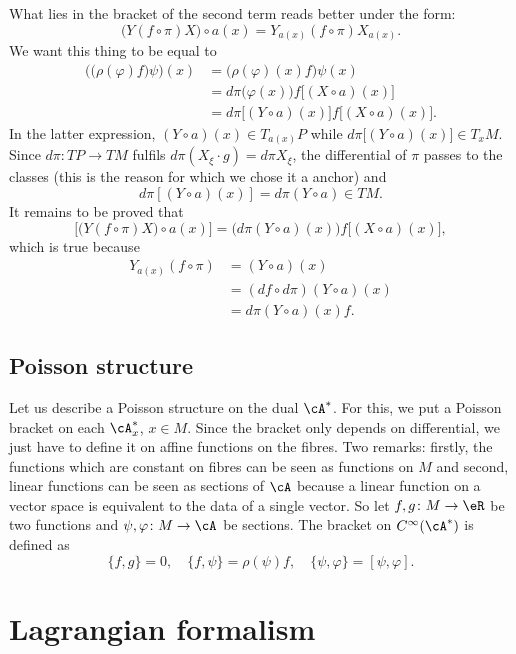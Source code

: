 What lies in the bracket of the second term reads better under the form:
\[
  \big( Y(f\circ\pi)X \big)\circ a(x)=Y_{a(x)}(f\circ\pi)X_{a(x)}.
\]
We want this thing to be equal to
\begin{align*}
\Big( \big( \rho(\varphi)f \big)\psi \Big)(x)&=\big( \rho(\varphi)(x)f \big)\psi(x)\\
		&=d\pi\big( \varphi(x) \big)f\big[ (X\circ a)(x) \big]\\
		&=d\pi\big[ (Y\circ a)(x) \big]f\big[ (X\circ a)(x) \big].
\end{align*}
In the latter expression, $(Y\circ a)(x)\in T_{a(x)}P$ while  $d\pi\big[ (Y\circ a)(x)\Big]\in T_{x}M$. Since $d\pi\colon TP\to TM$ fulfils $d\pi(X_{\xi}\cdot g)=d\pi X_{\xi}$, the differential of $\pi$ passes to the classes (this is the reason for which we chose it a anchor) and
\[
  d\pi[(Y\circ a)(x)]=d\pi(Y\circ a)\in TM.
\]
It remains to be proved that
\[
  \Big[ \big( Y(f\circ\pi)X \big)\circ a(x) \Big]=\big( d\pi(Y\circ a)(x) \big)f\big[ (X\circ a)(x) \big],
\]
which is true because
\begin{align*}
Y_{a(x)}(f\circ\pi)&=(Y\circ a)(x)\\
		&=(df\circ d\pi)(Y\circ a)(x)\\
		&=d\pi(Y\circ a)(x)f.
\end{align*}

\subsection{Poisson structure}

Let us describe a Poisson structure on the dual $\cA^*$. For this, we put a Poisson bracket on each $\cA^*_{x}$, $x\in M$. Since the bracket only depends on differential, we just have to define it on affine functions on the fibres. Two remarks: firstly, the functions which are constant on fibres can be seen as functions on $M$ and second, linear functions can be seen as sections of $\cA$ because a linear function on a vector space is equivalent to the data of a single vector. So let $f,g\colon M\to \eR$ be two functions and $\psi,\varphi\colon M\to \cA$ be sections. The bracket on $ C^{\infty}(\cA^*)$ is defined as
\begin{equation}
\{ f,g \}=0,\quad \{ f,\psi \}=\rho(\psi)f,\quad\{ \psi,\varphi \}=[\psi,\varphi].
\end{equation}

\section{Lagrangian formalism}

